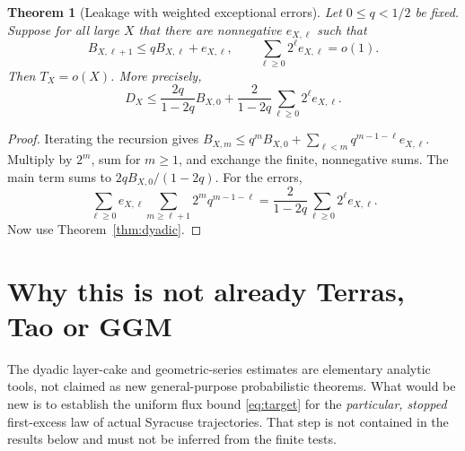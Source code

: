 \documentclass[11pt,a4paper]{article}
\newtheorem{theorem}{Theorem}
\theoremstyle{remark}
\begin{document}
\begin{theorem}[Leakage with weighted exceptional errors]\label{thm:robust}
Let $0\le q<1/2$ be fixed.  Suppose for all large $X$ that
there are nonnegative $e_{X,\ell}$ such that
\[
B_{X,\ell+1}\le qB_{X,\ell}+e_{X,\ell},
\qquad\sum_{\ell\ge0}2^\ell e_{X,\ell}=o(1).
\]
Then $T_X=o(X)$.  More precisely,
\begin{equation}\label{eq:robust-bound}
D_X\le \frac{2q}{1-2q}B_{X,0}
   +\frac2{1-2q}\sum_{\ell\ge0}2^\ell e_{X,\ell}.
\end{equation}
\end{theorem}
\begin{proof}
Iterating the recursion gives
$B_{X,m}\le q^m B_{X,0}+\sum_{\ell<m}q^{m-1-\ell}e_{X,\ell}$.
Multiply by $2^m$, sum for $m\ge1$, and exchange the finite,
nonnegative sums.  The main term sums to $2qB_{X,0}/(1-2q)$.
For the errors,
\[
\sum_{\ell\ge0}e_{X,\ell}
 \sum_{m\ge\ell+1}2^m q^{m-1-\ell}
=\frac2{1-2q}\sum_{\ell\ge0}2^\ell e_{X,\ell}.
\]
Now use Theorem~\ref{thm:dyadic}.
\end{proof}

\section{Why this is not already Terras, Tao or GGM}
The dyadic layer-cake and geometric-series estimates are elementary
analytic tools, not claimed as new general-purpose probabilistic
theorems.  What would be new is to establish the uniform flux bound
\eqref{eq:target} for the \emph{particular, stopped} first-excess law
of actual Syracuse trajectories.  That step is not contained in the
results below and must not be inferred from the finite tests.
\end{document}
